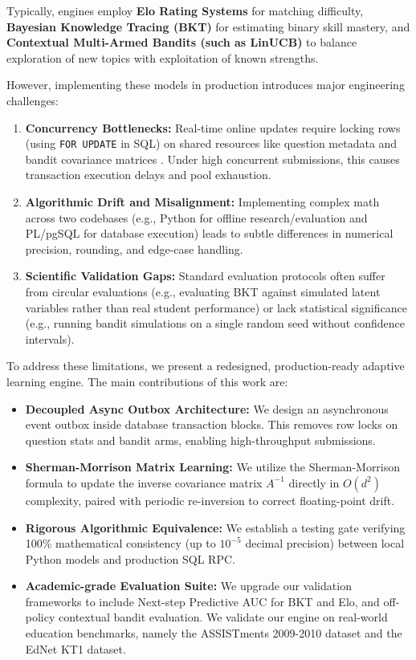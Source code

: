\documentclass{article}
\begin{document}
Typically, engines employ \textbf{Elo Rating Systems} for matching difficulty, \textbf{Bayesian Knowledge Tracing (BKT)} for estimating binary skill mastery, and \textbf{Contextual Multi-Armed Bandits (such as LinUCB)} to balance exploration of new topics with exploitation of known strengths. 

However, implementing these models in production introduces major engineering challenges:
\begin{enumerate}
    \item \textbf{Concurrency Bottlenecks:} Real-time online updates require locking rows (using \texttt{FOR UPDATE} in SQL) on shared resources like question metadata and bandit covariance matrices \cite{kleppmann2017designing}. Under high concurrent submissions, this causes transaction execution delays and pool exhaustion.
    \item \textbf{Algorithmic Drift and Misalignment:} Implementing complex math across two codebases (e.g., Python for offline research/evaluation and PL/pgSQL for database execution) leads to subtle differences in numerical precision, rounding, and edge-case handling.
    \item \textbf{Scientific Validation Gaps:} Standard evaluation protocols often suffer from circular evaluations (e.g., evaluating BKT against simulated latent variables rather than real student performance) or lack statistical significance (e.g., running bandit simulations on a single random seed without confidence intervals).
\end{enumerate}

To address these limitations, we present a redesigned, production-ready adaptive learning engine. The main contributions of this work are:
\begin{itemize}
    \item \textbf{Decoupled Async Outbox Architecture:} We design an asynchronous event outbox inside database transaction blocks. This removes row locks on question stats and bandit arms, enabling high-throughput submissions.
    \item \textbf{Sherman-Morrison Matrix Learning:} We utilize the Sherman-Morrison formula to update the inverse covariance matrix $A^{-1}$ directly in $O(d^2)$ complexity, paired with periodic re-inversion to correct floating-point drift.
    \item \textbf{Rigorous Algorithmic Equivalence:} We establish a testing gate verifying 100\% mathematical consistency (up to $10^{-5}$ decimal precision) between local Python models and production SQL RPC.
    \item \textbf{Academic-grade Evaluation Suite:} We upgrade our validation frameworks to include Next-step Predictive AUC for BKT and Elo, and off-policy contextual bandit evaluation. We validate our engine on real-world education benchmarks, namely the ASSISTments 2009-2010 dataset and the EdNet KT1 dataset.
\end{itemize}
\end{document}
